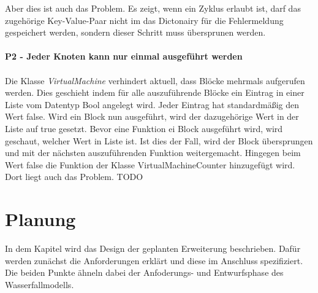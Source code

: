 \documentclass{article}
\begin{document}
        Aber dies ist auch das Problem. 
        Es zeigt, wenn ein Zyklus erlaubt ist, darf das zugehörige Key-Value-Paar nicht im das Dictonairy für die Fehlermeldung gespeichert werden, sondern dieser Schritt muss übersprunen werden.\\
        \\
        \textbf{P2 - Jeder Knoten kann nur einmal ausgeführt werden}\\
        \\
        Die Klasse \textit{VirtualMachine} verhindert aktuell, dass Blöcke mehrmals aufgerufen werden.
        Dies geschieht indem für alle auszuführende Blöcke ein Eintrag in einer Liste vom Datentyp Bool angelegt wird.
        Jeder Eintrag hat standardmäßig den Wert false. 
        Wird ein Block nun ausgeführt, wird der dazugehörige Wert in der Liste auf true gesetzt.
        Bevor eine Funktion ei Block ausgeführt wird, wird geschaut, welcher Wert in Liste ist.
        Ist dies der Fall, wird der Block übersprungen und mit der nächsten auszuführenden Funktion weitergemacht.
        Hingegen beim Wert false die Funktion der Klasse VirtualMachineCounter hinzugefügt wird.
        Dort liegt auch das Problem.
        TODO
    \newpage
    \section{Planung}
    In dem Kapitel wird das Design der geplanten Erweiterung beschrieben. 
    Dafür werden zunächst die Anforderungen erklärt und diese im Anschluss spezifiziert.
    Die beiden Punkte ähneln dabei der Anfoderungs- und Entwurfsphase des Wasserfallmodells.
\end{document}

